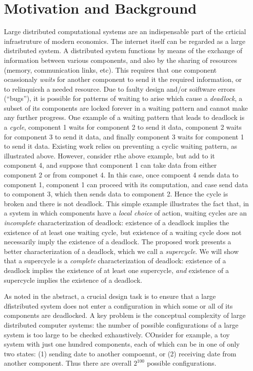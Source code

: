 \section{Motivation and Background}

Large distributed computational systems are an indispensable part of the crticial infrastruture of modern economics. The internet itself can be
regarded as a large distributed system.
%
A distributed system functions by means of the exchange of information between various components, and also by the sharing of resources (\eg memory,
communication links, etc). This requires that one component ocassionaly \emph{waits} for another component to send it the required information, or to
relinquicsh a needed resource.  Due to faulty design and/or soiftware errors (``bugs''), it is possible for patterns of waiting to arise which cause a
{\em deadlock}, \ie a subset of its components are locked forever in a waiting pattern and cannot make any further progress.
%
One example of a waiting pattern that leads to deadlock is a \emph{cycle}, \eg component 1 waits for component 2 to send it data, 
component 2 waits for component 3 to send it data, and finally 
component 3 waits for component 1 to send it data.
%
Existing work relies on preventing a cyclic waiting pattern, as illustrated above. However, consider rthe above example, but add to it component 4,
and suppose that component 1 can take data from either component 2 or from componet 4. In this case, once compoent 4 sends data to component 1,
component 1 can proceed with its computation, and case send data to component 3, which then sends data to component 2. Hence the cycle is broken and
there is not deadlock.
%
This simple example illustrates the fact that, in a system in which components have a \emph{local choice} of action, waiting cycles are an
\emph{incomplete} characterization of deadlock: existence of a deadlock implies the existence of at least one waiting cycle, but existence of a
waiting cycle does not necessarily imply the existence of a deadlock.
%
The proposed work presents a better characterization of a deadlock, which we call a \emph{supercycle}. We will show that a supercycle is a 
\emph{complete} characterization of deadlock: existence of a deadlock implies the existence of at least one supercycle, \emph{and} existence of a
supercycle implies the existence of a deadlock.

As noted in the abstract, a crucial design task is to ensure that a large dfistributed system does not enter a configuration in which some or all of
its components are deadlocked. 
A key problem is the conceptual complexity of large distributed computer systems: the number of possible configurations of a large system is 
too large to be checked exhaustively. COnsider for example, a toy system with just one hundred components, each of which can be in
one of only two states: (1) sending date to another compoennt, or (2) receiving date from another component. Thus there are overall $2^{100}$ possible
configurations. 



